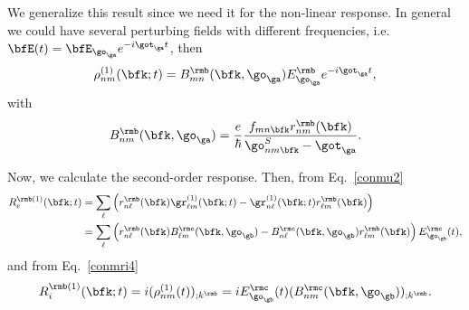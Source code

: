 \documentclass[floatfix,prb,aps,superscriptaddress,11pt,preprint,letterpaper]{revtex4}
\begin{document}
We generalize this result since we need it for the non-linear response.
In general we could have several perturbing fields with different
frequencies,
i.e. $\bfE(t)=\bfE_{\go_\ga} e^{-i\got_\ga t}$, then
\begin{equation}\label{rhonoi1}
\rho^{(1)}_{nm}(\bfk;t)=B^{\rmb}_{mn}(\bfk,\go_\ga)E_{\go_\ga}^{\rmb}e^{-i\got_\ga t}
,
\end{equation}
with
\begin{equation}\label{rho1} 
B^{\rmb}_{nm}(\bfk,\go_\ga)=\frac{e}{\hbar}\frac{f_{mn\bfk}r^{\rmb}_{nm}(\bfk)}{\go^S_{nm\bfk}-\got_\ga}
.
\end{equation} 

Now, we calculate the second-order response. Then, from Eq.~\eqref{conmu2}
\begin{align}\label{R1e}
R_e^{\rmb(1)}(\bfk;t)
&=
\sum_{\ell}
\left(
r^{\rmb}_{n\ell}(\bfk)
\gr^{(1)}_{\ell m}(\bfk;t)
-
\gr^{(1)}_{n\ell}(\bfk;t)
r^{\rmb}_{\ell m}(\bfk)
\right)
\nonumber \\
&=
\sum_{\ell}
\left(
r^{\rmb}_{n\ell}(\bfk)
B^{\rmc}_{\ell m}(\bfk,\go_\gb)
-
B^{\rmc}_{n\ell}(\bfk,\go_\gb)
r^{\rmb}_{\ell m}(\bfk)
\right)E_{\go_\gb}^{\rmc}(t)
,
\end{align}
and from Eq.~\eqref{conmri4}
\begin{equation}\label{R1i}
R_i^{\rmb(1)}(\bfk;t)=i(\rho^{(1)}_{nm}(t))_{;k^{\rmb}}=iE_{\go_\gb}^{\rmc}(t)(B^{\rmc}_{nm}(\bfk,\go_\gb))_{;k^{\rmb}}
.
\end{equation}
\end{document}
